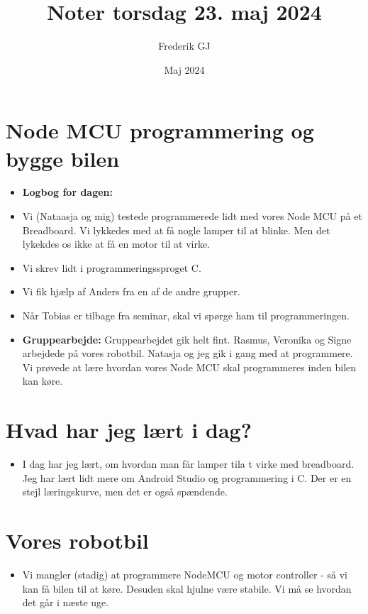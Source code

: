 \documentclass{article}
\title{Noter torsdag 23. maj 2024}
\author{Frederik GJ}
\date{Maj 2024}
\begin{document}
\maketitle

\section{Node MCU programmering og bygge bilen}

\begin{itemize}
    \item \textbf{Logbog for dagen:}
    \item Vi (Nataasja og mig) testede programmerede lidt med vores Node MCU på et Breadboard. Vi lykkedes med at få nogle lamper til at blinke. Men det lykekdes os ikke at få en motor til at virke. 
    \item Vi skrev lidt i programmeringssproget C. 
    \item Vi fik hjælp af Anders fra en af de andre grupper.
    \item Når Tobias er tilbage fra seminar, skal vi spørge ham til programmeringen.  
    \item \textbf{Gruppearbejde:} Gruppearbejdet gik helt fint. Rasmus, Veronika og Signe arbejdede på vores robotbil. Natasja og jeg gik i gang med at programmere. Vi prøvede at lære hvordan vores Node MCU skal programmeres inden bilen kan køre. 
\end{itemize}

\section{Hvad har jeg lært i dag?}
\begin{itemize}
    \item I dag har jeg lært, om hvordan man får lamper tila t virke med breadboard. Jeg har lært lidt mere om Android Studio og programmering i C. Der er en stejl læringskurve, men det er også spændende. 
\end{itemize}

\section{Vores robotbil}
\begin{itemize}
    \item Vi mangler (stadig) at programmere NodeMCU og motor controller - så vi kan få bilen til at køre. Desuden skal hjulne være stabile. Vi må se hvordan det går i næste uge.
\end{itemize}
\end{document}
